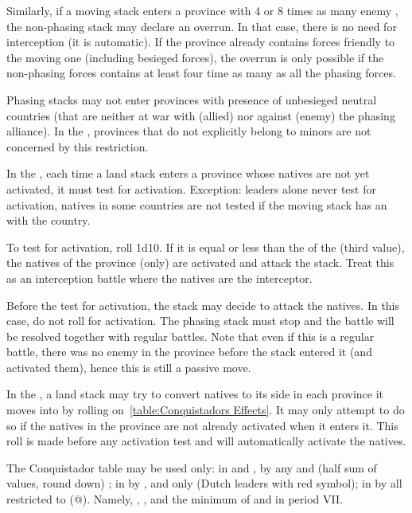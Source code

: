 Similarly, if a moving stack enters a province with 4 or 8 times as many enemy
\LD, the non-phasing stack may declare an overrun. In that case, there is no
need for interception (it is automatic). If the province already contains
forces friendly to the moving one (including besieged forces), the overrun is
only possible if the non-phasing forces contains at least four time as many
\LD as all the phasing forces.

Phasing stacks may not enter provinces with presence of unbesieged neutral
countries (that are neither at war with (allied) nor against (enemy) the
phasing alliance). In the \ROTW, provinces that do not explicitly belong to
minors are not concerned by this restriction.

In the \ROTW, each time a land stack enters a province whose natives are not
yet activated, it must test for activation. Exception: leaders alone never
test for activation, natives in some \ROTW countries are not tested if the
moving stack has an \dipAT with the country.

To test for activation, roll 1d10. If it is equal or less than the
 of the \Area (third value), the natives of the province
(only) are activated and attack the stack. Treat this as an interception
battle where the natives are the interceptor.

Before the test for activation, the stack may decide to attack the natives. In
this case, do not roll for activation. The phasing stack must stop and the
battle will be resolved together with regular battles. Note that even if this
is a regular battle, there was no enemy in the province before the stack
entered it (and activated them), hence this is still a passive move.

In the \ROTW, a land stack may try to convert natives to its side in each
province it moves into by rolling on~\ref{table:Conquistadors Effects}. It may
only attempt to do so if the natives in the province are not already activated
when it enters it. This roll is made before any activation test and will
automatically activate the natives.


The Conquistador table may be used only:
\bparag in  and , by any \LeaderC and
\LeaderE (half sum of values, round down) ;
\bparag in  by ,  and
 only (Dutch leaders with red symbol);
\bparag in  by all \LeaderC restricted to 
(@). Namely, , ,  and the minimum
\LeaderC@ of \FRA and \ANG in period VII.

